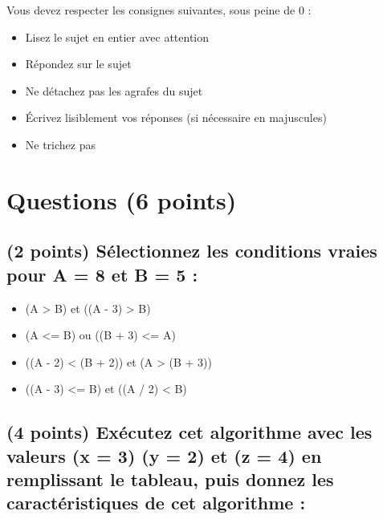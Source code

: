 \documentclass[11pt,a4paper]{article}
\begin{document}
\MakeExamTitle                   %


\bigskip

Vous devez respecter les consignes suivantes, sous peine de 0 :

\begin{itemize}
\item Lisez le sujet en entier avec attention
\item Répondez sur le sujet
\item Ne détachez pas les agrafes du sujet
\item \'Ecrivez lisiblement vos réponses (si nécessaire en majuscules)
\item Ne trichez pas
\end{itemize}



\section{Questions (6 points)}

\subsection{(2 points) Sélectionnez les conditions vraies pour A = 8 et B = 5 : }

\bigskip

\begin{itemize}
  \item[\CaseCoche] (A > B) et ((A - 3) > B)  %
  \item[\CaseCoche] (A <= B) ou ((B + 3) <= A)  %
  \item[\CaseCoche] ((A - 2) < (B + 2)) et (A > (B + 3))  %
  \item[\CaseCoche] ((A - 3) <= B) et ((A / 2) < B)  %
\end{itemize}


\medskip


\subsection{(4 points) Exécutez cet algorithme avec les valeurs (x = 3) (y = 2) et (z = 4) en remplissant le tableau, puis donnez les caractéristiques de cet algorithme : }
\end{document}
